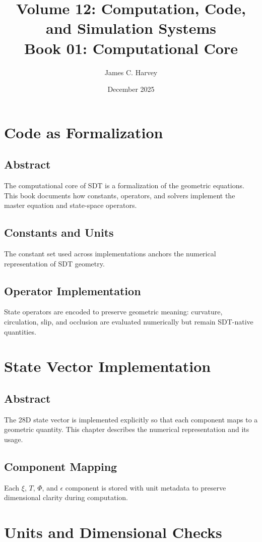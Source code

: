 \documentclass[12pt]{book}
\title{Volume 12: Computation, Code, and Simulation Systems \\ Book 01: Computational Core}
\author{James C. Harvey}
\date{December 2025}
\begin{document}
\maketitle
\tableofcontents

\chapter{Code as Formalization}

\section*{Abstract}
The computational core of SDT is a formalization of the geometric equations. This book documents how
constants, operators, and solvers implement the master equation and state-space operators.

\section{Constants and Units}
The constant set used across implementations anchors the numerical representation of SDT geometry.

\section{Operator Implementation}
State operators are encoded to preserve geometric meaning: curvature, circulation, slip, and occlusion
are evaluated numerically but remain SDT-native quantities.

\chapter{State Vector Implementation}

\section*{Abstract}
The 28D state vector is implemented explicitly so that each component maps to a geometric quantity. This
chapter describes the numerical representation and its usage.

\section{Component Mapping}
Each $\xi$, $T$, $\Phi$, and $\epsilon$ component is stored with unit metadata to preserve dimensional
clarity during computation.

\chapter{Units and Dimensional Checks}
\end{document}
